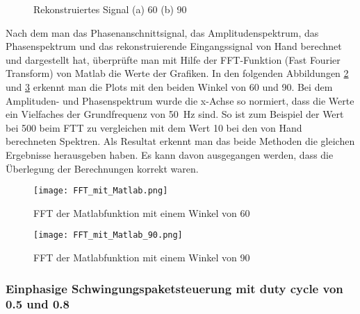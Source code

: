 \begin{figure}[h]
	\centering
	\qquad
	\caption{Rekonstruiertes Signal (a) 60\textdegree \hspace{0.02cm} (b) 90\textdegree}
	\label{fig:Rekonstruiertes Signal}
\end{figure} 


Nach dem man das Phasenanschnittsignal, das Amplitudenspektrum,  das Phasenspektrum und das rekonstruierende Eingangssignal von Hand berechnet und dargestellt hat, überprüfte man mit Hilfe der FFT-Funktion (Fast Fourier Transform) von Matlab die Werte der Grafiken. In den folgenden Abbildungen \ref{fig:FFT mit Matlab} und \ref{fig:FFT_mit_Matlab_90} erkennt man die Plots mit den beiden Winkel von 60\textdegree \hspace{0.02cm} und 90\textdegree \hspace{0.02cm}. Bei dem Amplituden- und Phasenspektrum wurde die x-Achse so normiert, dass die Werte ein Vielfaches der Grundfrequenz von \SI{50}{Hz} sind. So ist zum Beispiel der Wert bei 500 beim FTT zu vergleichen mit dem Wert 10 bei den von Hand berechneten Spektren. Als Resultat erkennt man das beide Methoden die gleichen Ergebnisse herausgeben haben. Es kann davon ausgegangen werden, dass die Überlegung der Berechnungen korrekt waren.

\begin{figure}[ht!]
	\centering
	\texttt{[image: FFT\_mit\_Matlab.png]}	
	\caption{FFT der Matlabfunktion mit einem Winkel von 60\textdegree}
	\label{fig:FFT mit Matlab}
\end{figure}

\begin{figure}[ht!]
	\centering
	\texttt{[image: FFT\_mit\_Matlab\_90.png]}	
	\caption{FFT der Matlabfunktion mit einem Winkel von 90\textdegree}
	\label{fig:FFT_mit_Matlab_90}
\end{figure}

\newpage

\subsubsection{Einphasige Schwingungspaketsteuerung mit duty cycle von 0.5 und 0.8}

